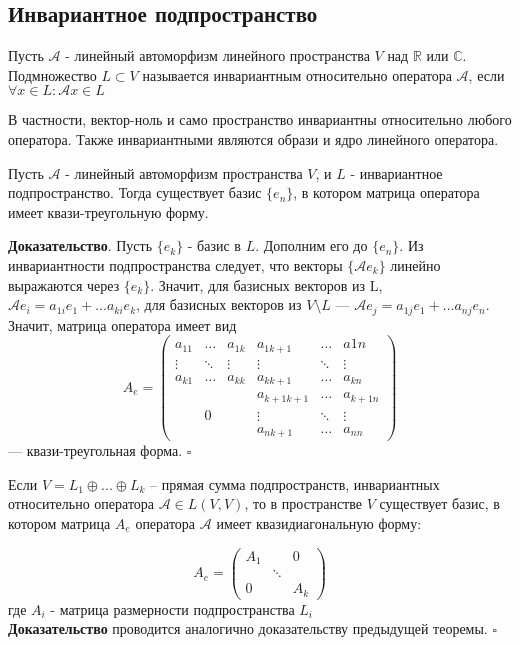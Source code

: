 \subsection{Инвариантное подпространство}
\begin{defin}
Пусть $\mathcal A$ - линейный автоморфизм линейного пространства $V$ над
$\mathbb R$ или $\mathbb C$. Подмножество $L\subset V$ называется инвариантным
относительно оператора $\mathcal A$, если
$\forall x\in L\colon\mathcal Ax\in L$
\end{defin}
В частности, вектор-ноль и само пространство инвариантны относительно любого
оператора. Также инвариантными являются образи и ядро линейного оператора. 
\begin{theor}
Пусть $\mathcal A$ - линейный автоморфизм пространства $V$, и $L$ - 
инвариантное подпространство. Тогда существует базис $\{e_n\}$, в котором
матрица оператора имеет квази-треугольную форму. 
\end{theor}
\textbf{Доказательство}. Пусть $\{e_k\}$ - базис в $L$. Дополним его до
$\{e_n\}$. Из инвариантности подпространства следует, что векторы
$\{\mathcal Ae_k\}$ линейно выражаются через $\{e_k\}$. Значит, для базисных 
векторов из L, $\mathcal Ae_i=a_{1i}e_1+...a_{ki}e_k$, для базисных векторов 
из $V\setminus L$ --- $\mathcal Ae_j=a_{1j}e_1+...a_{nj}e_n$. Значит, матрица 
оператора имеет вид
$$A_e=\begin{pmatrix}a_{11}&\ldots&a_{1k}&a_{1k+1}&\ldots&a{1n}\\\vdots&\ddots&
\vdots&\vdots&\ddots&\vdots\\a_{k1}&\ldots&a_{kk}&a_{kk+1}&\ldots&a_{kn}
	\\&&&a_{k+1k+1}&\ldots&a_{k+1n}\\&0&&\vdots&\ddots&\vdots\\&&&a_{nk+1}&
\ldots&a_{nn}\end{pmatrix}$$
--- квази-треугольная форма. $\square$
\begin{theor}
Если $V=L_1\oplus...\oplus L_k$ – прямая сумма подпространств, инвариантных
относительно оператора
$\mathcal A\in L(V,V)$, то в пространстве $V$
существует базис, в котором матрица $A_e$
оператора $\mathcal A$ имеет квазидиагональную форму:
\end{theor}
$$A_e=\begin{pmatrix}\boxed{A_1}&&0\\&\ddots&\\0&&\boxed{A_k}\end{pmatrix}$$
где $\boxed{A_i}$ - матрица размерности подпространства $L_i$\\
\textbf{Доказательство} проводится аналогично доказательству предыдущей 
теоремы. $\square$


